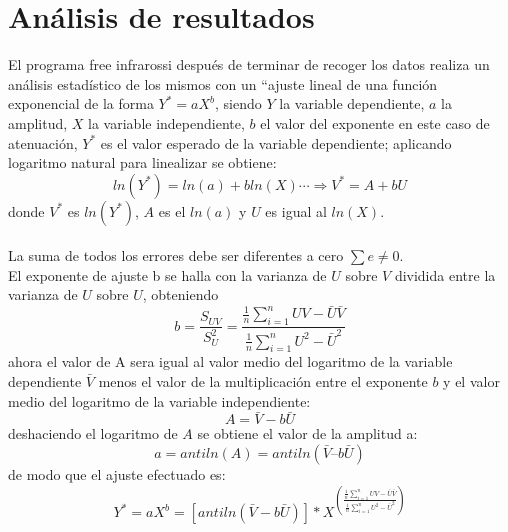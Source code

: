 \documentclass[12]{article}
\newenvironment{Figure}
{\par\medskip\noindent\minipage{\linewidth}}
{\endminipage\par\medskip}
\begin{document}
\begin{multicols}{2}
\begin{Figure}
\begin{tabular}{|l|r|}
\end{tabular}
\label{fig:g3}
\end{Figure}
\section{Análisis de resultados}
El programa free infrarossi después de terminar de recoger los datos realiza un análisis estadístico de los mismos con un “ajuste lineal de una función exponencial de la forma $Y^{*} = aX^{b}$, siendo $Y$ la variable dependiente, $a$ la amplitud, $X$ la variable independiente,  $b$ el valor del exponente en este caso de atenuación, $Y^{*}$ es el valor esperado de la variable dependiente; aplicando logaritmo natural para linealizar se obtiene:
\begin{equation}
ln ( Y^{*}) = ln (a) + bln(X)  \cdots \Longrightarrow V^{*} = A + bU
\end{equation} 
donde $V^{*}$ es $ln(Y^{*})$, $A $ es el $ln(a)$ y $U$ es igual al $ln(X)$. \\\\
La suma de  todos los errores debe ser diferentes a cero $\sum e \neq 0$. \\
El exponente de ajuste b se halla con la varianza de $U$ sobre $V$  dividida entre la varianza de $U$ sobre $U$, obteniendo
\begin{equation}
b = \frac{S_{UV}}{S^{2} _{U}} =  \frac{\frac{1}{n} \sum_{i=1}^{n} UV - \bar{U} \bar{V}}{\frac{1}{n} \sum _{i=1}^{n} U^{2} - \bar{U}^2}
\end{equation}
ahora el valor de A sera igual al valor medio del logaritmo de la variable dependiente $\bar{V}$ menos el valor de la multiplicación entre el exponente $b$ y el valor medio del logaritmo de la variable independiente:
\begin{equation}
A = \bar{V} -b\bar{U}
\end{equation}
deshaciendo el logaritmo de $A$  se obtiene el valor de la amplitud a:
\begin{equation}
a = antiln(A) = antiln(\bar{V} – b\bar{U})
\end{equation}
de modo que el ajuste efectuado es:
\begin{equation}
Y^{*} =  aX^{b}  = [antiln(\bar{V} - b\bar{U})]*X^{ \left(\frac{\frac{1}{n} \sum_{i=1}^{n} UV - \bar{U} \bar{V}}{\frac{1}{n} \sum _{i=1}^{n} U^{2} - \bar{U}^{2}}\right)}

\end{equation}
\end{multicols}
\end{document}
